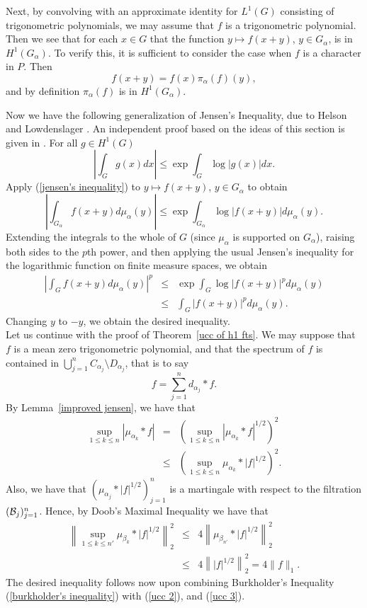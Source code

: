 \documentclass[12pt,leqno]{article}
\begin{document}
Next, by convolving 
with an approximate identity
for $L^1(G)$
consisting of trigonometric
polynomials, we may assume  
that $f$ is a 
trigonometric polynomial.
Then we see that for each $x \in G$ that 
the function $y\mapsto f(x+y)$, $y\in G_\alpha$, is 
in $H^1(G_\alpha)$.  To verify this, it is sufficient
to consider the case when
$f$ is a character in $P$.  Then
$$ f(x+y)= f(x) \pi_\alpha (f)(y), $$
and by definition $\pi_\alpha(f)$ is in $H^1(G_\alpha)$.

Now we have the following generalization of Jensen's Inequality,
due to Helson and Lowdenslager 
\cite[Theorem 2]{hl1}.  An independent proof based on the ideas of this 
section is given in \cite{ams3}.  For all $g\in H^1(G)$
\begin{equation}
\left|\int_G g(x) d x\right| \leq \exp \int_G\log
|g(x)|d x.
\label{jensen's inequality}
\end{equation}
Apply (\ref{jensen's inequality}) to $y\mapsto f(x+y)$, $y\in G_\alpha$
to obtain
$$
\left|\int_{G_\alpha} f(x+y) d \mu_\alpha(y)\right| 
\leq \exp \int_{G_\alpha}\log
|f(x+y)|d \mu_\alpha(y).
$$
Extending the integrals to the whole of $G$ (since $\mu_\alpha$ is 
supported on $G_\alpha$),
raising both sides to the 
$p$th power, and then applying
the usual Jensen's inequality for the 
logarithmic function on finite measure spaces, 
we obtain
\begin{eqnarray*}
\left|\int_G f(x+y) d \mu_\alpha(y)\right|^p 
	&\leq& 
\exp \int_G \log
|f(x+y)|^p d \mu_\alpha(y)\\
	&\leq&
\int_G |f(x+y)|^pd \mu_\alpha(y).
\end{eqnarray*}
Changing $y$ to $-y$, we obtain the desired inequality.\\

Let us continue with the proof of Theorem~\ref{ucc of h1 fts}.
We may suppose that $f$ is a mean zero
trigonometric polynomial, and that
the spectrum of $f$ is contained in 
$\bigcup_{j=1}^n C_{\alpha_j} \setminus D_{\alpha_j} $, that is to say
$$ f = \sum_{j=1}^n d_{\alpha_j} * f .$$
By Lemma~\ref{improved jensen}, we have that
\begin{eqnarray}
\sup_{1\leq k\leq n} 
\left|
\mu_{\alpha_k}*f
\right|   
		&=&
\left(
\sup_{1\leq k\leq n} 
\left|
\mu_{\alpha_k}*f
\right|^{1/2}\right)^2   \nonumber\\
		&\leq&
\left(
\sup_{1\leq k\leq n} 
\mu_{\alpha_k}*| f|^{1/2}
\right)^2.   
\label{ucc 2}
\end{eqnarray}
Also, we have that 
$(\mu_{\alpha_j}*|f|^{1/2})_{j=1}^n$
is a martingale with respect to the filtration $({\cal B}_j)_{j=1}^n$.
Hence, by Doob's Maximal
Inequality \cite[Theorem (3.1), p. 317]{doob} we have that
\begin{eqnarray}
\left\| 
\sup_{1\leq k\leq n'} 
\mu_{\beta_k}*| f|^{1/2}
\right\|_2^2
			&\leq&
4
\left\|
\mu_{\beta_{n'}}*| f|^{1/2}
\right\|_2^2              \nonumber\\
			&\leq& 
4 \left\| |f|^{1/2}\right\|_2^2 = 4\|f\|_1.
\label{ucc 3}
\end{eqnarray}
The desired inequality follows now upon combining
Burkholder's Inequality (\ref{burkholder's inequality})
with (\ref{ucc 2}), and (\ref{ucc 3}).\\
\end{document}
